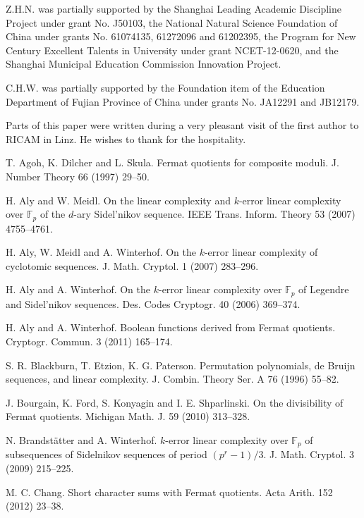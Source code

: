 \documentclass [11pt,a4paper]{article}
\def\F{\mathbb{F}}
\begin{document}
Z.H.N. was partially supported by the Shanghai Leading Academic Discipline Project under grant No. J50103,
the National Natural Science Foundation of China  under grants No. 61074135, 61272096 and 61202395, the Program for New Century Excellent Talents in University  under grant NCET-12-0620, and the Shanghai Municipal Education Commission Innovation Project.

C.H.W. was partially supported by the Foundation item of the Education Department of Fujian Province of China under grants No. JA12291 and JB12179.

Parts of this paper were written during a very pleasant visit of the
first author to RICAM in Linz. He wishes to thank for the hospitality.


\begin{thebibliography}{99}

 T. Agoh, K. Dilcher and L. Skula.
Fermat quotients for composite moduli.  J.  Number Theory 66
(1997) 29--50.

 H. Aly and  W. Meidl. On the linear complexity and $k$-error linear complexity over $\F_p$ of
the $d$-ary Sidel'nikov sequence. IEEE Trans. Inform. Theory 53 (2007) 4755--4761.

H. Aly,  W. Meidl and A. Winterhof. On the $k$-error linear complexity
of cyclotomic sequences. J. Math. Cryptol. 1 (2007)
283--296.


H. Aly and  A. Winterhof. On the $k$-error linear complexity over $\F_p$ of Legendre
and Sidel'nikov sequences. Des. Codes Cryptogr. 40 (2006) 369--374.

 H. Aly  and A. Winterhof. Boolean functions derived from Fermat
quotients. Cryptogr. Commun. 3 (2011) 165--174.

S. R. Blackburn, T. Etzion, K. G. Paterson.  Permutation
polynomials, de Bruijn sequences, and linear complexity. J. Combin.
Theory Ser. A 76 (1996)  55--82.



J. Bourgain, K. Ford, S. Konyagin and I. E. Shparlinski. On the
divisibility of Fermat quotients. Michigan Math. J. 59 (2010) 313--328.

 N. Brandst\"{a}tter and A. Winterhof. $k$-error linear complexity over $\F_p$  of subsequences of Sidelnikov sequences of period $(p^r-1)/3$. J. Math. Cryptol. 3 (2009)  215--225.



M. C. Chang. Short character sums with Fermat quotients. Acta Arith.
152 (2012) 23--38.


\end{thebibliography}
\end{document}
